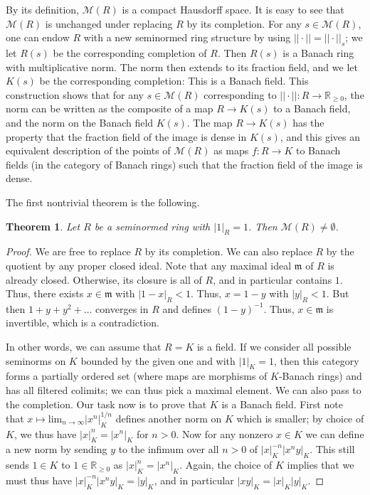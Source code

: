 \documentclass[11pt]{amsart}
\numberwithin{equation}{section}
\newtheorem{theorem}{Theorem}
\numberwithin{theorem}{section}
\theoremstyle{definition}
\begin{document}
By its definition, $\mathcal M(R)$ is a compact Hausdorff space. It is easy to see that $\mathcal M(R)$ is unchanged under replacing $R$ by its completion. For any $s\in \mathcal M(R)$, one can endow $R$ with a new seminormed ring structure by using $||\cdot||=||\cdot||_s$; we let $R(s)$ be the corresponding completion of $R$. Then $R(s)$ is a Banach ring with multiplicative norm. The norm then extends to its fraction field, and we let $K(s)$ be the corresponding completion: This is a Banach field. This construction shows that for any $s\in \mathcal M(R)$ corresponding to $||\cdot||: R\to \mathbb R_{\geq 0}$, the norm can be written as the composite of a map $R\to K(s)$ to a Banach field, and the norm on the Banach field $K(s)$. The map $R\to K(s)$ has the property that the fraction field of the image is dense in $K(s)$, and this gives an equivalent description of the points of $\mathcal M(R)$ as maps $f: R\to K$ to Banach fields (in the category of Banach rings) such that the fraction field of the image is dense.

The first nontrivial theorem is the following.

\begin{theorem}\label{thm:berkovichnonempty} Let $R$ be a seminormed ring with $|1|_R=1$. Then $\mathcal M(R)\neq \emptyset$.
\end{theorem}

\begin{proof} We are free to replace $R$ by its completion. We can also replace $R$ by the quotient by any proper closed ideal. Note that any maximal ideal $\mathfrak m$ of $R$ is already closed. Otherwise, its closure is all of $R$, and in particular contains $1$. Thus, there exists $x\in \mathfrak m$ with $|1-x|_R<1$. Thus, $x=1-y$ with $|y|_R<1$. But then $1+y+y^2+\ldots$ converges in $R$ and defines $(1-y)^{-1}$. Thus, $x\in \mathfrak m$ is invertible, which is a contradiction.

In other words, we can assume that $R=K$ is a field. If we consider all possible seminorms on $K$ bounded by the given one and with $|1|_K=1$, then this category forms a partially ordered set (where maps are morphisms of $K$-Banach rings) and has all filtered colimits; we can thus pick a maximal element. We can also pass to the completion. Our task now is to prove that $K$ is a Banach field. First note that $x\mapsto \mathrm{lim}_{n\to \infty} |x^n|_K^{1/n}$ defines another norm on $K$ which is smaller; by choice of $K$, we thus have $|x|_K^n=|x^n|_K$ for $n>0$. Now for any nonzero $x\in K$ we can define a new norm by sending $y$ to the infimum over all $n>0$ of $|x|_K^{-n} |x^ny|_K$. This still sends $1\in K$ to $1\in \mathbb R_{\geq 0}$ as $|x|_K^n=|x^n|_K$. Again, the choice of $K$ implies that we must thus have $|x|_K^{-n} |x^ny|_K = |y|_K$, and in particular $|xy|_K=|x|_K|y|_K$.
\end{proof}
\end{document}
